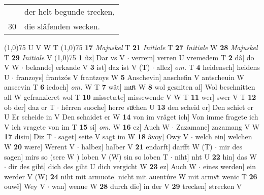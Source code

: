 \documentclass[8pt,a4paper,notitlepage]{article}
\begin{document}
\begin{table}[ht]
\begin{minipage}[t]{0.5\linewidth}
\begin{tabular}{rl}
 & der helt begunde trecken,\\ 
30 & die slâfenden wecken.\\ 
\end{tabular}
\scriptsize
\line(1,0){75} \newline
U V W T \newline
\line(1,0){75} \newline
\textbf{17} \textit{Majuskel} T  \textbf{21} \textit{Initiale} T  \textbf{27} \textit{Initiale} W  \textbf{28} \textit{Majuskel} T  \textbf{29} \textit{Initiale} V  \newline
\line(1,0){75} \newline
\textbf{1} ûz] Dar vs V  $\cdot$ verrem] verren U vremedem T \textbf{2} dâ] do V W  $\cdot$ bekande] erkande V \textbf{3} ist] daz ist V (T)  $\cdot$ allez] \textit{om.} T \textbf{4} heidensch] heidens U  $\cdot$ franzoys] frantzós V frantzoys W \textbf{5} Anschevin] anschefin V antscheuin W anscevin T \textbf{6} iedoch] \textit{om.} W T \textbf{7} wât] muͦt W \textbf{8} wol gesniten al] Wol beschnitten all W gefranzieret wol T \textbf{10} missetæte] missewende V W T \textbf{11} wer] swer V T \textbf{12} ob der] daz er T  $\cdot$ hêrren suoche] herre suͦchen U \textbf{13} den scheid er] Den schiet er U Er scheide in V Den schaidet er W \textbf{14} von im vrâget ich] Von imme fragete ich V ich vragete von im T \textbf{15} si] \textit{om.} W \textbf{16} ez] Auch W  $\cdot$ Zazamanc] zazamang V W \textbf{17} disiu] Diz T  $\cdot$ saget] seite V sagt im W \textbf{18} âvoy] Owẏ V  $\cdot$ welch ein] welchen W \textbf{20} wære] Werent V  $\cdot$ halbez] halber V \textbf{21} endarft] darfft W (T)  $\cdot$ mir des sagen] mirs so (sere W ) loben V (W) sin so loben T  $\cdot$ niht] nht U \textbf{22} hin] das W  $\cdot$ dir des giht] dich des giht U dich vergicht W \textbf{23} ez] Auch W  $\cdot$ eines werden] ein werder V (W) \textbf{24} niht mit armuote] nicht mit auentúre W mit armvͦt wenic T \textbf{26} ouwê] Wey V  $\cdot$ wan] wenue W \textbf{28} durch die] in der V \textbf{29} trecken] strecken V \newline
\end{minipage}
\end{table}
\end{document}

